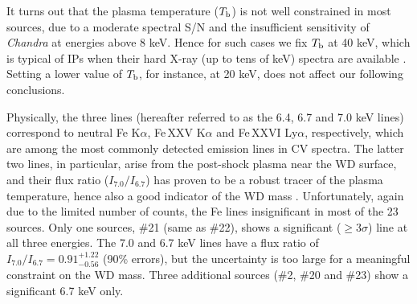 \documentclass[fleqn,usenatbib]{mnras}
\begin{document}
It turns out that the plasma temperature ($T_{\rm b}$) is not well constrained in most sources, due to a moderate spectral S/N and the insufficient sensitivity of {\it Chandra} at energies above 8 keV. Hence for such cases we fix $T_{\rm b}$ at 40 keV, which is typical of IPs when their hard X-ray (up to tens of keV) spectra are available \citep{2016ApJ...818..136X,2016ApJ...826..160H}.
Setting a lower value of $T_{\rm b}$, for instance, at 20 keV, does not affect our following conclusions.

Physically, the three lines (hereafter referred to as the 6.4, 6.7 and 7.0 keV lines) correspond to neutral Fe K$\alpha$, Fe\,XXV K$\alpha$ and Fe\,XXVI Ly$\alpha$, respectively, which are among the most commonly detected emission lines in CV spectra. The latter two lines, in particular, arise from the post-shock plasma near the WD surface, and their flux ratio ($I_{7.0}/I_{6.7}$) has proven to be a robust tracer of the plasma temperature, hence also a good indicator of the WD mass \citep{2016ApJ...818..136X}.
Unfortunately, again due to the limited number of counts, the Fe lines insignificant in most of the 23 sources.
Only one sources, \#21 (same as \#22), shows a significant ($\geq 3 \sigma$) line at all three energies. The 7.0 and 6.7 keV lines have a flux ratio of $I_{7.0}/I_{6.7} = 0.91^{+1.22}_{-0.56}$ (90\% errors), but the uncertainty is too large for a meaningful constraint on the WD mass. Three additional sources (\#2, \#20 and \#23) show a significant 6.7 keV only.   




\end{document}
